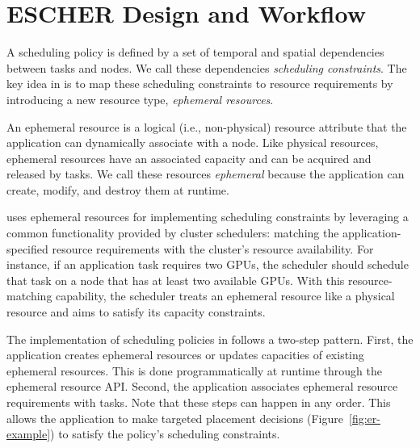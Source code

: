 \section{ESCHER Design and Workflow}
\label{sec:arch}


A scheduling policy is defined by a set of temporal and spatial dependencies between tasks and nodes. We call these dependencies \emph{scheduling constraints}. 
The key idea in \name{} is to map these scheduling constraints to resource requirements by introducing a new resource type, \emph{ephemeral resources}.

 An ephemeral resource is a logical (i.e., non-physical) resource attribute that the application can dynamically associate with a node. Like physical resources, ephemeral resources have an associated capacity and can be acquired and released by tasks. 
We call these resources \emph{ephemeral} because the application can create, modify, and destroy them at runtime.

\name{} uses ephemeral resources for implementing scheduling constraints by leveraging a common functionality provided by cluster schedulers: matching the application-specified resource requirements with the cluster's resource availability. For instance, if an application task requires two GPUs, the scheduler should schedule that task on a node that has at least two available GPUs. With this resource-matching capability, the scheduler treats an ephemeral resource like a physical resource and aims to satisfy its capacity constraints.

The implementation of scheduling policies in \name{} follows a two-step pattern. First, the application creates ephemeral resources or updates capacities of existing ephemeral resources. This is done programmatically at runtime through the ephemeral resource API. Second, the application associates ephemeral resource requirements with tasks.
Note that these steps can happen in any order.
This allows the application to make targeted placement decisions (Figure~\ref{fig:er-example}) to satisfy the policy's scheduling constraints.

